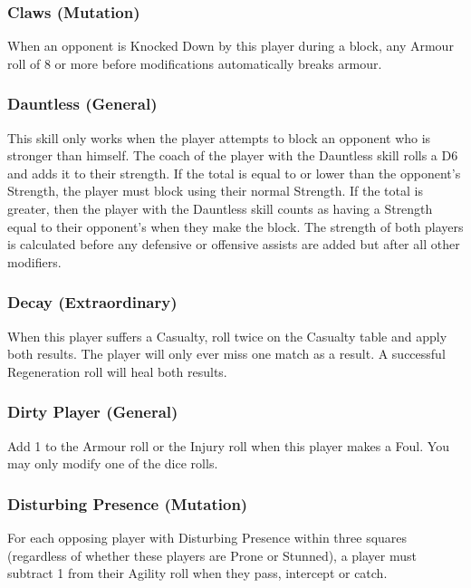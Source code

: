 \begin{multicols}{3}
\subsubsection{Claws (Mutation)}
\par When an opponent is Knocked Down by this player during a block, any Armour roll of 8 or more before modifications automatically breaks armour.

\subsubsection{Dauntless (General)}
\par This skill only works when the player attempts to block an opponent who is stronger than himself. The coach of the player with the Dauntless skill rolls a D6 and adds it to their strength. If the total is equal to or lower than the opponent's Strength, the player must block using their normal Strength. If the total is greater, then the player with the Dauntless skill counts as having a Strength equal to their opponent's when they make the block. The strength of both players is calculated before any defensive or offensive assists are added but after all other modifiers.

\subsubsection{Decay (Extraordinary)}
\par When this player suffers a Casualty, roll twice on the Casualty table and apply both results. The player will only ever miss one match as a result. A successful Regeneration roll will heal both results.

\subsubsection{Dirty Player (General)}
\par Add 1 to the Armour roll or the Injury roll when this player makes a Foul. You may only modify one of the dice rolls.

\subsubsection{Disturbing Presence (Mutation)}
\par For each opposing player with Disturbing Presence within three squares (regardless of whether these players are Prone or Stunned), a player must subtract 1 from their Agility roll when they pass, intercept or catch.


\end{multicols}
